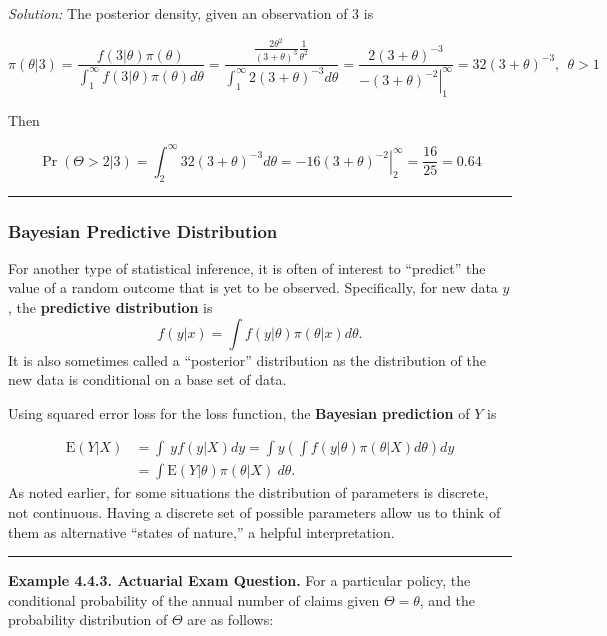 \documentclass[]{book}
\theoremstyle{definition}
\theoremstyle{definition}
\theoremstyle{definition}
\theoremstyle{remark}
\begin{document}
\hypertarget{toggleExampleSelect.4.2}{}
\emph{Solution:} The posterior density, given an observation of 3 is

\[\pi(\theta|3) =  \frac{f(3|\theta)\pi(\theta)}{\int_1^\infty f(3|\theta)\pi(\theta)d\theta} =
\frac{\frac{2\theta^2}{(3+\theta)^3}\frac{1}{\theta^2}}{\int_1^\infty 2(3+\theta)^{-3} d\theta} =
\frac{2(3+\theta)^{-3}}{\left. -(3+\theta)^{-2}\right|_1^\infty} = 32(3+\theta)^{-3}, \ \ \theta > 1\]

Then

\[\Pr(\Theta>2|3) = \int_2^\infty 32(3+\theta)^{-3}d\theta = \left. -16(3+\theta)^{-2} \right|_2^\infty = \frac{16}{25} = 0.64\]

\begin{center}\rule{0.5\linewidth}{\linethickness}\end{center}

\subsubsection{Bayesian Predictive
Distribution}\label{bayesian-predictive-distribution}

For another type of statistical inference, it is often of interest to
``predict'' the value of a random outcome that is yet to be observed.
Specifically, for new data \(y\), the \textbf{predictive distribution}
is \[f(y|x) = \int f(y|\theta) \pi(\theta|x) d\theta .\] It is also
sometimes called a ``posterior'' distribution as the distribution of the
new data is conditional on a base set of data.

Using squared error loss for the loss function, the \textbf{Bayesian
prediction} of \(Y\) is

\[
\begin{aligned}
\mathrm{E}(Y|X) &=  \int ~y f(y|X) dy = \int y \left(\int f(y|\theta) \pi(\theta|X) d\theta \right) dy \\
&=  \int  \mathrm{E}(Y|\theta) \pi(\theta|X) ~d\theta .
\end{aligned}
\] As noted earlier, for some situations the distribution of parameters
is discrete, not continuous. Having a discrete set of possible
parameters allow us to think of them as alternative ``states of
nature,'' a helpful interpretation.

\begin{center}\rule{0.5\linewidth}{\linethickness}\end{center}

\textbf{Example 4.4.3. Actuarial Exam Question.} For a particular
policy, the conditional probability of the annual number of claims given
\(\Theta = \theta\), and the probability distribution of \(\Theta\) are
as follows:
\end{document}
